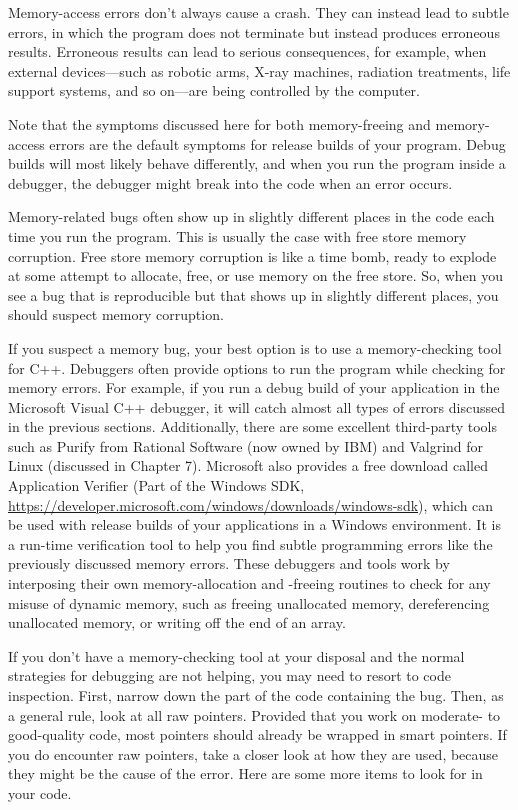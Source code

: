 Memory-access errors don’t always cause a crash. They can instead lead to subtle errors, in which the program does not terminate but instead produces erroneous results. Erroneous results can lead to serious consequences, for example, when external devices—such as robotic arms, X-ray machines, radiation treatments, life support systems, and so on—are being controlled by the computer.

Note that the symptoms discussed here for both memory-freeing and memory-access errors are the default symptoms for release builds of your program. Debug builds will most likely behave differently, and when you run the program inside a debugger, the debugger might break into the code when an error occurs.


Memory-related bugs often show up in slightly different places in the code each time you run the program. This is usually the case with free store memory corruption. Free store memory corruption is like a time bomb, ready to explode at some attempt to allocate, free, or use memory on the free store. So, when you see a bug that is reproducible but that shows up in slightly different places, you should suspect memory corruption.

If you suspect a memory bug, your best option is to use a memory-checking tool for C++. Debuggers often provide options to run the program while checking for memory errors. For example, if you run a debug build of your application in the Microsoft Visual C++ debugger, it will catch almost all types of errors discussed in the previous sections. Additionally, there are some excellent third-party tools such as Purify from Rational Software (now owned by IBM) and Valgrind for Linux (discussed in Chapter 7). Microsoft also provides a free download called Application Verifier (Part of the Windows SDK, \url{https://developer.microsoft.com/windows/downloads/windows-sdk}), which can be used with release builds of your applications in a Windows environment. It is a run-time verification tool to help you find subtle programming errors like the previously discussed memory errors. These debuggers and tools work by interposing their own memory-allocation and -freeing routines to check for any misuse of dynamic memory, such as freeing unallocated memory, dereferencing unallocated memory, or writing off the end of an array.

If you don’t have a memory-checking tool at your disposal and the normal strategies for debugging are not helping, you may need to resort to code inspection. First, narrow down the part of the code containing the bug. Then, as a general rule, look at all raw pointers. Provided that you work on moderate- to good-quality code, most pointers should already be wrapped in smart pointers. If you do encounter raw pointers, take a closer look at how they are used, because they might be the cause of the error. Here are some more items to look for in your code.

